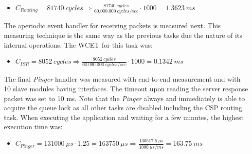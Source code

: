 \begin{itemize}
	\item $C_{Routing} = 81740\ cycles \Rightarrow \frac{81740\ cycles}{60.000.000\ cycles/sec} \cdot 1000 = 1.3623\ ms$
\end{itemize}

The aperiodic event handler for receiving packets is measured next. This measuring technique is the same way as the previous tasks due the nature of its internal operations. The WCET for this task was:

\begin{itemize}
	\item $C_{ISR} = 8052\ cycles \Rightarrow \frac{8052\ cycles}{60.000.000\ cycles/sec} \cdot 1000 = 0.1342\ ms$
\end{itemize}

The final \textit{Pinger} handler was measured with end-to-end measurement and with 10 slave modules having \iic interfaces. The timeout upon reading the server response packet was set to 10 ms. Note that the \textit{Pinger} always and immediately is able to acquire the queue lock as all other tasks are disabled including the CSP routing task. When executing the application and waiting for a few minutes, the highest execution time was:

\begin{itemize}
	\item $C_{Pinger} = 131000\ \mu s \cdot 1.25 = 163750\ \mu s \Rightarrow \frac{130517.5\ \mu s}{1000\ \mu s /ms} = 163.75\ ms$
\end{itemize}
